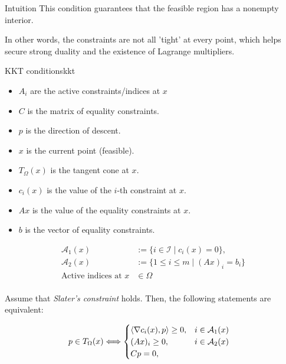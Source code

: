 \begin{remark}{Intuition}{}
  This condition guarantees that the feasible region has a nonempty interior.

  In other words, the constraints are not all 'tight' at every point, which helps secure strong duality and the existence of Lagrange multipliers.
\end{remark}

\begin{theorem}{KKT conditions}{kkt}

  \medskip

  \begin{itemize}
    \item \(A_i\) are the active constraints/indices at \(x\)
    \item \(C\) is the matrix of equality constraints.
    \item \(p\) is the direction of descent.
    \item \(x\) is the current point (feasible).
    \item \(T_{\Omega}(x)\) is the tangent cone at \(x\).
    \item \(c_i(x)\) is the value of the \(i\)-th constraint at \(x\).
    \item \(Ax\) is the value of the equality constraints at \(x\).
    \item \(b\) is the vector of equality constraints.
  \end{itemize}
  \begin{align*}
    \mathcal{A}_1(x)            & := \{i \in \mathcal{I} \mid c_i(x) = 0\},                     \\
    \mathcal{A}_2(x)            & := \{1 \leq i \leq m \mid (Ax)_i = b_i\} \tag{Active indices} \\
    \text{Active indices at } x & \in \Omega                                                    \\
  \end{align*}

  Assume that \emph{Slater's constraint} holds. Then, the following statements are equivalent:

  \begin{align*}
    p\in T_{\Omega}(x) & \Longleftrightarrow
    \begin{cases}
      \langle\nabla c_i(x), p\rangle \geq 0, & i \in \mathcal{A}_1(x) \\
      (Ax)_i \geq 0,                   & i \in \mathcal{A}_2(x) \\
      Cp = 0,                          &                        \\
    \end{cases}
  \end{align*}

\end{theorem}


